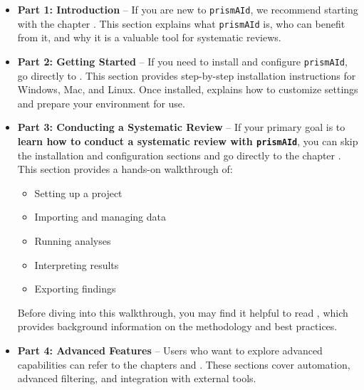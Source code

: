 \begin{itemize}
    \item \textbf{Part 1: Introduction} – If you are new to \texttt{prismAId}, we recommend starting with the chapter . This section explains what \texttt{prismAId} is, who can benefit from it, and why it is a valuable tool for systematic reviews.
    
    \item \textbf{Part 2: Getting Started} – If you need to install and configure \texttt{prismAId}, go directly to . This section provides step-by-step installation instructions for Windows, Mac, and Linux. Once installed,  explains how to customize settings and prepare your environment for use.
    
    \item \textbf{Part 3: Conducting a Systematic Review} – If your primary goal is to \textbf{learn how to conduct a systematic review with \texttt{prismAId}}, you can skip the installation and configuration sections and go directly to the chapter . This section provides a hands-on walkthrough of:
    \begin{itemize}
        \item Setting up a project
        \item Importing and managing data
        \item Running analyses
        \item Interpreting results
        \item Exporting findings
    \end{itemize}
    Before diving into this walkthrough, you may find it helpful to read , which provides background information on the methodology and best practices.

    \item \textbf{Part 4: Advanced Features} – Users who want to explore advanced capabilities can refer to the chapters  and . These sections cover automation, advanced filtering, and integration with external tools.
    

\end{itemize}
